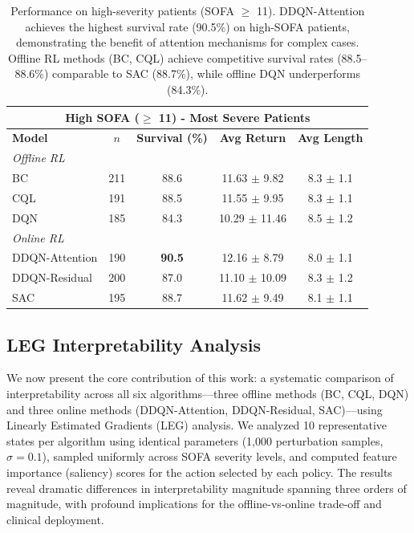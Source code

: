 \begin{table}[htbp]
\centering
\caption{Performance on high-severity patients (SOFA $\geq$ 11). DDQN-Attention achieves the highest survival rate (90.5\%) on high-SOFA patients, demonstrating the benefit of attention mechanisms for complex cases. Offline RL methods (BC, CQL) achieve competitive survival rates (88.5--88.6\%) comparable to SAC (88.7\%), while offline DQN underperforms (84.3\%).}
\label{tab:sofa-stratified}
\begin{tabular}{lcccc}
\toprule
\multicolumn{5}{c}{\textbf{High SOFA ($\geq$ 11) - Most Severe Patients}} \\
\midrule
\textbf{Model} & \textbf{$n$} & \textbf{Survival (\%)} & \textbf{Avg Return} & \textbf{Avg Length} \\
\midrule
\multicolumn{5}{l}{\textit{Offline RL}} \\
BC              & 211 & 88.6 & 11.63 $\pm$ 9.82  & 8.3 $\pm$ 1.1 \\
CQL             & 191 & 88.5 & 11.55 $\pm$ 9.95  & 8.3 $\pm$ 1.1 \\
DQN             & 185 & 84.3 & 10.29 $\pm$ 11.46 & 8.5 $\pm$ 1.2 \\
\midrule
\multicolumn{5}{l}{\textit{Online RL}} \\
DDQN-Attention  & 190 & \textbf{90.5} & 12.16 $\pm$ 8.79  & 8.0 $\pm$ 1.1 \\
DDQN-Residual   & 200 & 87.0 & 11.10 $\pm$ 10.09 & 8.3 $\pm$ 1.2 \\
SAC             & 195 & 88.7 & 11.62 $\pm$ 9.49  & 8.1 $\pm$ 1.1 \\
\bottomrule
\end{tabular}
\end{table}


\subsection{LEG Interpretability Analysis}\label{sec:results:leg}

We now present the core contribution of this work: a systematic comparison of interpretability across all six algorithms---three offline methods (BC, CQL, DQN) and three online methods (DDQN-Attention, DDQN-Residual, SAC)---using Linearly Estimated Gradients (LEG) analysis. We analyzed 10 representative states per algorithm using identical parameters (1,000 perturbation samples, $\sigma=0.1$), sampled uniformly across SOFA severity levels, and computed feature importance (saliency) scores for the action selected by each policy. The results reveal dramatic differences in interpretability magnitude spanning three orders of magnitude, with profound implications for the offline-vs-online trade-off and clinical deployment.

